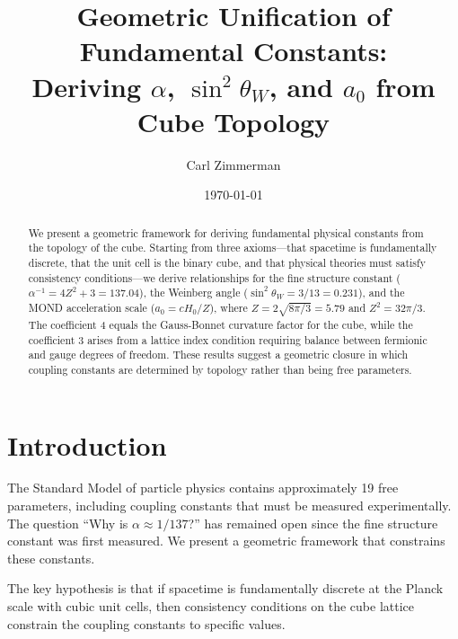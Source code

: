 \documentclass[twocolumn,showpacs,preprintnumbers,amsmath,amssymb,prd]{revtex4-2}
\begin{document}
\title{Geometric Unification of Fundamental Constants:\\
Deriving $\alpha$, $\sin^2\theta_W$, and $a_0$ from Cube Topology}

\author{Carl Zimmerman}

\date{\today}

\begin{abstract}
We present a geometric framework for deriving fundamental physical constants from the topology of the cube. Starting from three axioms---that spacetime is fundamentally discrete, that the unit cell is the binary cube, and that physical theories must satisfy consistency conditions---we derive relationships for the fine structure constant ($\alpha^{-1} = 4Z^2 + 3 = 137.04$), the Weinberg angle ($\sin^2\theta_W = 3/13 = 0.231$), and the MOND acceleration scale ($a_0 = cH_0/Z$), where $Z = 2\sqrt{8\pi/3} = 5.79$ and $Z^2 = 32\pi/3$. The coefficient 4 equals the Gauss-Bonnet curvature factor for the cube, while the coefficient 3 arises from a lattice index condition requiring balance between fermionic and gauge degrees of freedom. These results suggest a geometric closure in which coupling constants are determined by topology rather than being free parameters.
\end{abstract}


\maketitle

\section{Introduction}

The Standard Model of particle physics contains approximately 19 free parameters, including coupling constants that must be measured experimentally. The question ``Why is $\alpha \approx 1/137$?'' has remained open since the fine structure constant was first measured. We present a geometric framework that constrains these constants.

The key hypothesis is that if spacetime is fundamentally discrete at the Planck scale with cubic unit cells, then consistency conditions on the cube lattice constrain the coupling constants to specific values.
\end{document}
